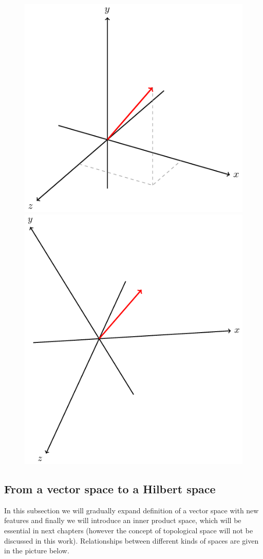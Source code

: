 \begin{legal}
\begin{figure}[ht]
\begin{minipage}{.5\textwidth}
          \centering
          \includegraphics[width=.6\linewidth]{original_vector}
        \end{minipage}%
        \begin{minipage}{.5\textwidth}
          \centering
          \includegraphics[width=.6\linewidth]{rotated_basis}
        \end{minipage}
    \end{figure}
\end{legal}

\subsection{From a vector space to a Hilbert space}

In this subsection we will gradually expand definition of a vector space with new features and finally we will introduce an inner product space, which will be essential in next chapters (however the concept of topological space will not be discussed in this work). Relationships between different kinds of spaces are given in the picture below.


